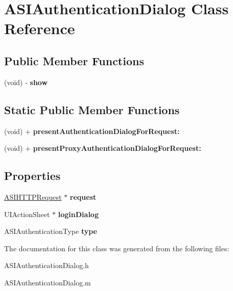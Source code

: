 \hypertarget{interface_a_s_i_authentication_dialog}{
\section{ASIAuthenticationDialog Class Reference}
\label{interface_a_s_i_authentication_dialog}
}
\subsection*{Public Member Functions}
\begin{DoxyCompactItemize}
\item 
\hypertarget{interface_a_s_i_authentication_dialog_ac12b99fc65aed45271e0522e491112b5}{
(void) -\/ {\bfseries show}}
\label{interface_a_s_i_authentication_dialog_ac12b99fc65aed45271e0522e491112b5}

\end{DoxyCompactItemize}
\subsection*{Static Public Member Functions}
\begin{DoxyCompactItemize}
\item 
\hypertarget{interface_a_s_i_authentication_dialog_a07eb1b70ffa5f5279a32a23f3e1de378}{
(void) + {\bfseries presentAuthenticationDialogForRequest:}}
\label{interface_a_s_i_authentication_dialog_a07eb1b70ffa5f5279a32a23f3e1de378}

\item 
\hypertarget{interface_a_s_i_authentication_dialog_a9a416683bb30a40ee4b30235c0a95797}{
(void) + {\bfseries presentProxyAuthenticationDialogForRequest:}}
\label{interface_a_s_i_authentication_dialog_a9a416683bb30a40ee4b30235c0a95797}

\end{DoxyCompactItemize}
\subsection*{Properties}
\begin{DoxyCompactItemize}
\item 
\hypertarget{interface_a_s_i_authentication_dialog_a81f6906124b139ce97634beb09753e26}{
\hyperlink{interface_a_s_i_h_t_t_p_request}{ASIHTTPRequest} $\ast$ {\bfseries request}}
\label{interface_a_s_i_authentication_dialog_a81f6906124b139ce97634beb09753e26}

\item 
\hypertarget{interface_a_s_i_authentication_dialog_a837705d54e469fe8a7b2b2be020b9731}{
UIActionSheet $\ast$ {\bfseries loginDialog}}
\label{interface_a_s_i_authentication_dialog_a837705d54e469fe8a7b2b2be020b9731}

\item 
\hypertarget{interface_a_s_i_authentication_dialog_a5b64f718db2c00f0fe624e3e8ed89930}{
ASIAuthenticationType {\bfseries type}}
\label{interface_a_s_i_authentication_dialog_a5b64f718db2c00f0fe624e3e8ed89930}

\end{DoxyCompactItemize}


The documentation for this class was generated from the following files:\begin{DoxyCompactItemize}
\item 
ASIAuthenticationDialog.h\item 
ASIAuthenticationDialog.m\end{DoxyCompactItemize}
